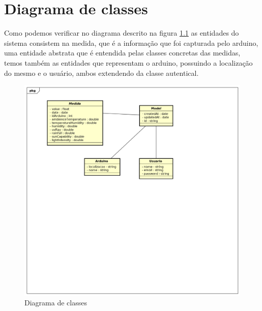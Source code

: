 \chapter{Diagrama de classes}

Como podemos verificar no diagrama descrito na figura \ref{figure_diagrama_classe} as entidades do sistema consistem na medida, que é a informação que foi capturada pelo arduino, uma entidade abstrata que é entendida pelas classes concretas das medidas, temos também as entidades que representam o arduino, possuindo a localização do mesmo e o usuário, ambos extendendo da classe autentical.

\begin{figure}[H]
    \label{figure_diagrama_classe}
    \centering
    \caption{Diagrama de classes}
    \includegraphics[scale=0.5]{diagrams/classe.png}
    \hfill
\end{figure}
